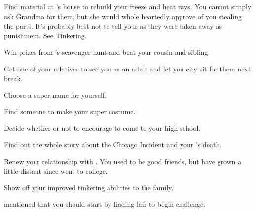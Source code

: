 \documentclass[char]{LRSguildcamp1}
\begin{document}
 
\begin{itemz}[Goals]
	\item Find material at \cGrandma{}'s house to rebuild your freeze and heat rays. You cannot simply ask Grandma for them, but she would whole heartedly approve of you stealing the parts. It's probably best not to tell your \cArchitect{\parent} as they were taken away as punishment. See Tinkering. 
	
	\item Win prizes from \cGrandma{}'s scavenger hunt and beat your cousin and sibling.
	
		\item Get one of your relatives to see you as an adult and let you city-sit for them next break.
		
		\item Choose a super name for yourself.
		
		\item Find someone to make your super costume. 
		
		\item Decide whether or not to encourage \cTween{} to come to your high school.
		
		\item Find out the whole story about the Chicago Incident and your \cAS{\parent}'s death.
		
		\item Renew your relationship with \cGrad{}. You used to be good friends, but have grown a little distant since \cGrad{} went to college.
		
		\item Show off your improved tinkering abilities to the family.

		
\end{itemz}

\begin{itemz}[Notes]
	\item \cGrandma{} mentioned that you should start by finding \cGrandma{\their} lair to begin \cGrandma{\their} challenge.
\end{itemz}
\end{document}
